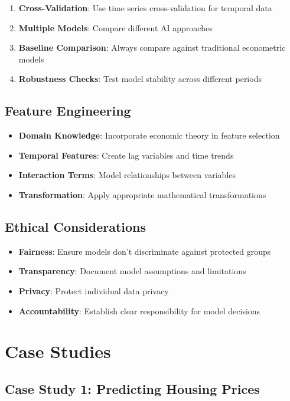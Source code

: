 \documentclass[12pt,a4paper]{article}
\begin{document}
\begin{enumerate}
    \item \textbf{Cross-Validation}: Use time series cross-validation for temporal data
    \item \textbf{Multiple Models}: Compare different AI approaches
    \item \textbf{Baseline Comparison}: Always compare against traditional econometric models
    \item \textbf{Robustness Checks}: Test model stability across different periods
\end{enumerate}

\subsection{Feature Engineering}

\begin{itemize}
    \item \textbf{Domain Knowledge}: Incorporate economic theory in feature selection
    \item \textbf{Temporal Features}: Create lag variables and time trends
    \item \textbf{Interaction Terms}: Model relationships between variables
    \item \textbf{Transformation}: Apply appropriate mathematical transformations
\end{itemize}

\subsection{Ethical Considerations}

\begin{itemize}
    \item \textbf{Fairness}: Ensure models don't discriminate against protected groups
    \item \textbf{Transparency}: Document model assumptions and limitations
    \item \textbf{Privacy}: Protect individual data privacy
    \item \textbf{Accountability}: Establish clear responsibility for model decisions
\end{itemize}

\section{Case Studies}

\subsection{Case Study 1: Predicting Housing Prices}
\end{document}
